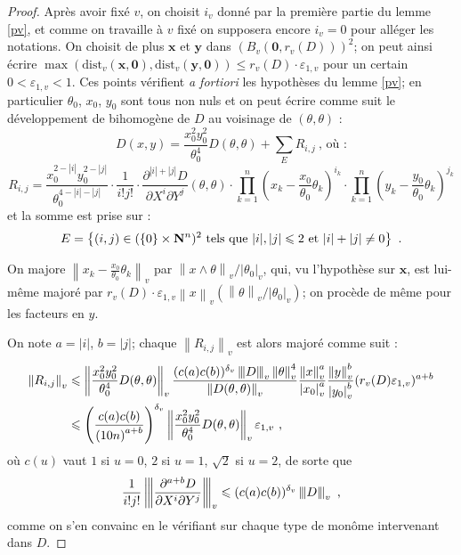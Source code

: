 \documentclass[11pt, twoside, a4paper, french]{article}
\numberwithin{equation}{section}
\newcommand{\lat}[1]{\emph{#1}} \newcommand{\pmm}[1]{\ \text{#1}}
\newcommand{\eps}{\varepsilon} \newcommand{\truc}{\,\cdot\,}
\newcommand{\av}[2][v]{\left\lvert#2\right\rvert_{#1}} 		%
\newcommand{\nv}[2][v]{\left\lVert#2\right\rVert_{#1}} 		%
\newcommand{\nnv}[2][v]{\left\lvert\hspace{-1pt}\left\lvert\hspace{-1pt}\left\lvert#2\right\rvert\hspace{-1pt}\right\rvert\hspace{-1pt}\right\rvert_{#1}}
\newcommand{\dv}{{\delta_v}} 					%
\newcommand{\Dv}{\mathrm{dist}_v} 				%
\newcommand{\p}[1]{{\boldsymbol{#1}}} 				%
\newcommand{\OA}{\p{0}} 					%
\newcommand{\coa}{\theta} 					%
\newcommand{\lgr}[1]{{|#1|}} 					%
\begin{document}
\begin{proof}
Après avoir fixé $v$, on choisit $i_v$ donné par la première partie du lemme \ref{pv}, et comme on travaille à $v$ fixé on supposera encore $i_v = 0$ pour alléger les notations. On choisit de plus $\p{x}$ et $\p{y}$ dans $(B_v(\OA, r_v(D)))^2$; on peut ainsi écrire $\max(\Dv(\p x, \OA), \Dv(\p y, \OA)) \le r_v(D)\cdot\eps_{1, v}$ pour un certain $0 < \eps_{1, v} < 1$. Ces points vérifient \lat{a fortiori} les hypothèses du lemme \ref{pv}; en particulier $\coa_0$, $x_0$, $y_0$ sont tous non nuls et on peut écrire comme suit le développement de  bihomogène de $D$ au voisinage de $(\coa, \coa)$ :
\[ D(x, y) = \frac{x_0^2y_0^2}{\coa_0^4}D(\coa, \coa) + \sum_E R_{i, j} \pmm{, où :} \]
\[
R_{i, j} = \frac{x_0^{2-\lgr{i}}y_0^{2-\lgr{j}}}{\coa_0^{4-\lgr{i}-\lgr{j}}}\cdot \frac{1}{i!j!} \cdot
\frac{\partial^{\lgr{i}+\lgr{j}}D}{\partial X^i \partial Y^j}(\coa, \coa) \cdot
\prod_{k=1}^n \left( x_{k} - \frac{x_0}{\coa_0} \coa_{k} \right)^{i_k} \cdot \prod_{k=1}^n \left( y_{k} - \frac{y_0}{\coa_0} \coa_{k} \right)^{j_k}
\]
et la somme est prise sur :
\[E = \left\{ (i, j) \in (\{0\} \times \N^n)^2 \text{ tels que } \lgr{i},\lgr{j} \le 2 \text{ et } \lgr{i}+\lgr{j} \neq 0 \right\} \pmm{.} \]

On majore $\nv{x_k - \frac{x_0}{\coa_0} \coa_k}$ par $\nv{x \wedge \coa}/\av{\coa_0}$, qui, vu l'hypothèse sur $\p{x}$, est lui-même majoré par $r_v(D)\cdot\eps_{1, v} \nv{x} (\nv{\coa}/\av{\coa_0})$; on procède de même pour les facteurs en $y$.

On note $a = \lgr{i}$, $b=\lgr{j}$; chaque $\nv{R_{i, j}}$ est alors majoré comme suit :
\begin{align*}
\nv{R_{i, j}} & \le
\nv{\frac{x_0^2y_0^2}{\coa_0^4}D(\coa, \coa)}
\frac{(c(a)c(b))^\dv \nnv{D}\nv{\coa}^4}{\nv{D(\coa, \coa)}}
\frac{\nv{x}^a}{\av{x_0}^a} \frac{\nv{y}^b}{\av{y_0}^b} (r_v(D)\eps_{1, v})^{a+b}\\
& \le \left( \frac{c(a)c(b)}{\left( 10n \right)^{a+b}} \right)^\dv \nv{\frac{x_0^2y_0^2}{\coa_0^4}D(\coa, \coa)} \eps_{1, v} \pmm{,}
\end{align*}
où $c(u)$ vaut $1$ si $u=0$, $2$ si $u=1$, $\sqrt{2}$ si $u=2$, de sorte que
\[ \frac{1}{i!j!}\nnv{\frac{\partial^{a+b}D}{\partial X^i \partial Y^j}} \le (c(a) c(b))^\dv \nnv{D}\pmm{,} \]
comme on s'en convainc en le vérifiant sur chaque type de monôme intervenant dans $D$.


\end{proof}
\end{document}
